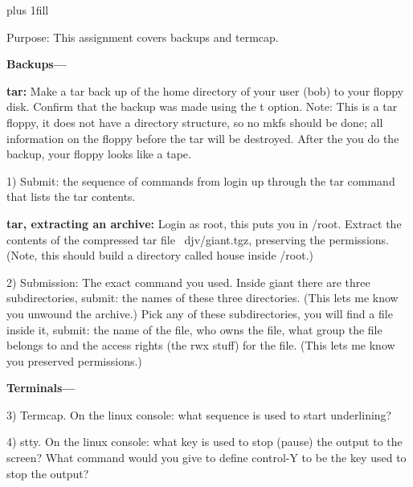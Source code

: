 
\rightskip=0pt plus 1fill

\parindent 0pt

Purpose: This assignment covers backups and termcap.

{\bf Backups---}

{\bf tar:}
Make a tar back up of the home directory of your user (bob) to your floppy
disk.
Confirm that the backup was made using the {\ltt{}t} option.
Note: This is a tar floppy, it does not have a directory structure,
so no mkfs should be done; all information on the floppy before
the tar will be destroyed. After the you do the backup, your
floppy looks like a tape.

1) Submit: the sequence of commands from login up through the
tar command that lists the tar contents.

{\bf tar, extracting an archive:}
Login as root, this puts you in {\ltt{}/root}.
Extract the contents of the compressed tar file {\ltt{}~djv/giant.tgz},
preserving the permissions.
(Note, this should build a directory called {\ltt{}house} inside {\ltt{}/root}.)

2) Submission: The exact command you used.
Inside {\ltt{}giant} there are three subdirectories, submit: the names of
these three directories. (This lets me know you unwound the archive.)
Pick any of these subdirectories, you will find a file inside it,
submit: the name of the file, who owns the file, what group the file
belongs to and the access rights (the {\ltt{}rwx} stuff) for the file.
(This lets me know you preserved permissions.)

{\bf Terminals---}

3) Termcap.
On the linux console: what sequence is used to 
start underlining?

4) stty.
On the linux console: what key is used to stop (pause) the output to the
screen?
What command would you give to define control-Y to be the key used
to stop the output?

\bye
